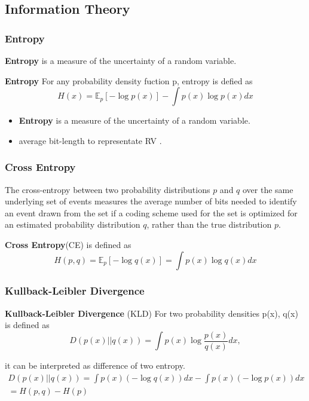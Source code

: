\documentclass[aspectratio=169]{beamer}
\begin{document}
\subsection{Information Theory}
\begin{frame}
	\frametitle{Entropy}
	\textbf{Entropy} is a measure of the uncertainty of a random variable.
	\begin{definition}
		\textbf{Entropy} For any probability density fuction p, entropy is defied as
		\begin{equation*}H(x) = \mathbb{E}_p [-\log p(x)] - \int {p(x)\log{p(x)}dx}\end{equation*}
	\end{definition}
	\begin{itemize}
		\item \textbf{Entropy} is a measure of the uncertainty of a random variable.
		\item average bit-length to representate RV \cite{shannon1948mathematical}.
	\end{itemize}
\end{frame}

\begin{frame}
	\frametitle{Cross Entropy}
	The cross-entropy between two probability distributions $p$ and $q$
	over the same underlying set of events measures
	the average number of bits needed to identify an event
	drawn from the set if a coding scheme used for the set
	is optimized for an estimated probability distribution $q$, rather than the true distribution $p$.
	\begin{definition}
		\textbf{Cross Entropy}(CE) is defined as 
		\begin{equation*}H(p, q) = \mathbb{E}_p [-\log q(x)] = \int p(x) \log q(x)dx\end{equation*}
	\end{definition}
	\end{frame}

\begin{frame}
	\frametitle{Kullback-Leibler Divergence}
	\begin{definition}
		\textbf{Kullback-Leibler Divergence} (KLD) For two probability densities p(x), q(x) is defined as
		\begin{equation*}D(p(x)||q(x))
			= \int p(x) \log \frac{p(x)}{q(x)}dx,\end{equation*}
	\end{definition}
	it can be interpreted as difference of two entropy.
	\begin{align*}
		D(p(x)||q(x)) = \int p(x) (-\log{q(x)})dx - \int p(x) (-\log{p(x)})dx \\
		= H(p, q) - H(p)
	\end{align*}
\end{frame}
\end{document}
